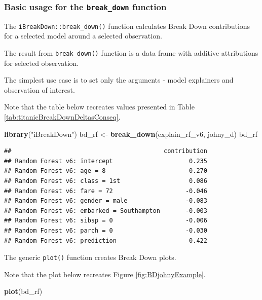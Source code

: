 \documentclass[12pt,]{krantz}
\newenvironment{Shaded}{\begin{snugshade}}{\end{snugshade}}
\newcommand{\KeywordTok}[1]{\textcolor[rgb]{0.13,0.29,0.53}{\textbf{#1}}}
\newcommand{\NormalTok}[1]{#1}
\newcommand{\StringTok}[1]{\textcolor[rgb]{0.31,0.60,0.02}{#1}}
\theoremstyle{definition}
\theoremstyle{definition}
\theoremstyle{definition}
\theoremstyle{remark}
\begin{document}
\hypertarget{basic-usage-for-the-break_down-function}{%
\subsubsection{\texorpdfstring{Basic usage for the \texttt{break\_down}
function}{Basic usage for the break\_down function}}\label{basic-usage-for-the-break_down-function}}

The \texttt{iBreakDown::break\_down()} function calculates Break Down
contributions for a selected model around a selected observation.

The result from \texttt{break\_down()} function is a data frame with
additive attributions for selected observation.

The simplest use case is to set only the arguments - model explainers
and observation of interest.

Note that the table below recreates values presented in Table
\ref{tab:titanicBreakDownDeltasConseq}.

\begin{Shaded}
\begin{Highlighting}[]
\KeywordTok{library}\NormalTok{(}\StringTok{"iBreakDown"}\NormalTok{)}
\NormalTok{bd_rf <-}\StringTok{ }\KeywordTok{break_down}\NormalTok{(explain_rf_v6,}
\NormalTok{                 johny_d)}
\NormalTok{bd_rf}
\end{Highlighting}
\end{Shaded}

\begin{verbatim}
##                                          contribution
## Random Forest v6: intercept                     0.235
## Random Forest v6: age = 8                       0.270
## Random Forest v6: class = 1st                   0.086
## Random Forest v6: fare = 72                    -0.046
## Random Forest v6: gender = male                -0.083
## Random Forest v6: embarked = Southampton       -0.003
## Random Forest v6: sibsp = 0                    -0.006
## Random Forest v6: parch = 0                    -0.030
## Random Forest v6: prediction                    0.422
\end{verbatim}

The generic \texttt{plot()} function creates Break Down plots.

Note that the plot below recreates Figure \ref{fig:BDjohnyExample}.

\begin{Shaded}
\begin{Highlighting}[]
\KeywordTok{plot}\NormalTok{(bd_rf) }
\end{Highlighting}
\end{Shaded}
\end{document}
